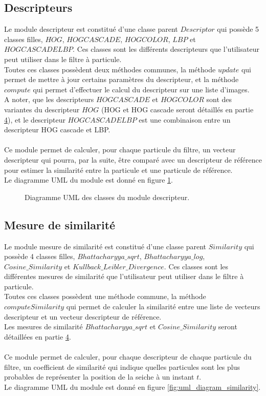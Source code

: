 \subsection{Descripteurs}
Le module descripteur est constitué d'une classe parent $Descriptor$ qui possède 5 classes filles, $HOG$, $HOGCASCADE$, $HOGCOLOR$, $LBP$ et $HOGCASCADELBP$. Ces classes sont les différents descripteurs que l'utilisateur peut utiliser dans le filtre à particule.\\
Toutes ces classes possèdent deux méthodes communes, la méthode $update$ qui permet de mettre à jour certains paramètres du descripteur, et la méthode $compute$ qui permet d'effectuer le calcul du descripteur sur une liste d'images.\\
A noter, que les descripteurs $HOGCASCADE$ et $HOGCOLOR$ sont des variantes du descripteur $HOG$ (HOG et HOG cascade seront détaillés en partie \hyperlink{chapter.4}{4}), et le descripteur $HOGCASCADELBP$ est une combinaison entre un descripteur HOG cascade et LBP.\\
\\
Ce module permet de calculer, pour chaque particule du filtre, un vecteur descripteur qui pourra, par la suite, être comparé avec un descripteur de référence pour estimer la similarité entre la particule et une particule de référence.\\
Le diagramme UML du module est donné en figure \ref{fig:uml_diagram_descriptor}.

\begin{figure}[!htbp]
\center
\caption{Diagramme UML des classes du module descripteur.}
\label{fig:uml_diagram_descriptor}
\end{figure}
\FloatBarrier




\subsection{Mesure de similarité}
Le module mesure de similarité est constitué d'une classe parent $Similarity$ qui possède 4 classes filles, $Bhattacharyya\_sqrt$, $Bhattacharyya\_log$, $Cosine\_Similarity$ et $Kullback\_Leibler\_Divergence$. Ces classes sont les différentes mesures de similarité que l'utilisateur peut utiliser dans le filtre à particule.\\
Toutes ces classes possèdent une méthode commune, la méthode $computeSimilarity$ qui permet de calculer la similarité entre une liste de vecteurs descripteur et un vecteur descripteur de référence.\\
Les mesures de similarité $Bhattacharyya\_sqrt$ et $Cosine\_Similarity$ seront détaillées en partie \hyperlink{chapter.4}{4}.\\
\\
Ce module permet de calculer, pour chaque descripteur de chaque particule du filtre, un coefficient de similarité qui indique quelles particules sont les plus probables de représenter la position de la seiche à un instant $t$.\\
Le diagramme UML du module est donné en figure \ref{fig:uml_diagram_similarity}.

